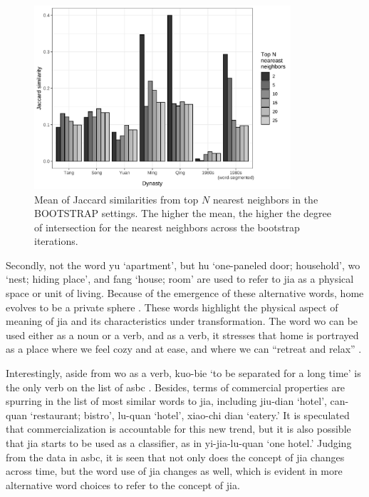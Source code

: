 \begin{figure}[H]
  \centering
  \includegraphics[width=0.85\textwidth,keepaspectratio]{figures_new/bootstrap_for_stability/jaccard_similarity_grey.pdf}
  \caption{Mean of Jaccard similarities from top $N$ nearest neighbors in the BOOTSTRAP settings. The higher the mean, the higher the degree of intersection for the nearest neighbors across the bootstrap iterations.}
\end{figure}

Secondly, not the word yu `apartment', but hu `one-paneled door; household', wo `nest; hiding place', and fang `house; room' are used to refer to jia as a physical space or unit of living. Because of the emergence of these alternative words, home evolves to be a private sphere \parencite{mallett2004understanding}. These words highlight the physical aspect of meaning of jia and its characteristics under transformation. The word wo can be used either as a noun or a verb, and as a verb, it stresses that home is portrayed as a place where we feel cozy and at ease, and where we can ``retreat and relax'' \parencite{mallett2004understanding}. 

Interestingly, aside from wo as a verb, kuo-bie `to be separated for a long time' is the only verb on the list of \gls{asbc}  \parencite{mallett2004understanding,samanani2019house}. Besides, terms of commercial properties are spurring in the list of most similar words to jia, including jiu-dian `hotel', can-quan `restaurant; bistro', lu-quan `hotel', xiao-chi dian `eatery.' It is speculated that commercialization is accountable for this new trend, but it is also possible that jia starts to be used as a classifier, as in yi-jia-lu-quan `one hotel.' Judging from the data in \gls{asbc}, it is seen that not only does the concept of jia changes across time, but the word use of jia changes as well, which is evident in more alternative word choices to refer to the concept of jia. 

